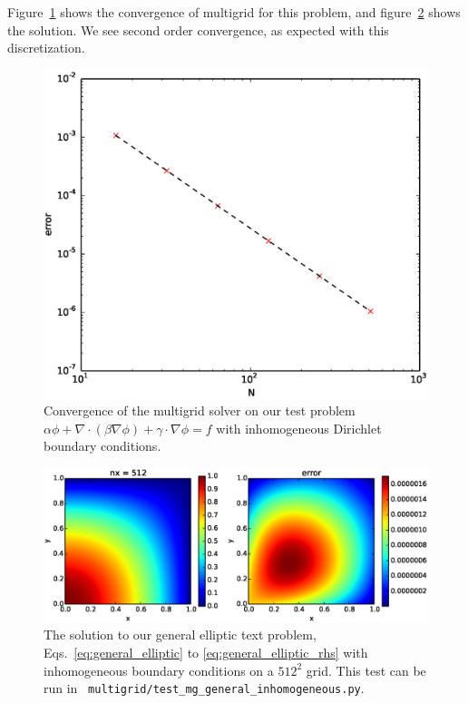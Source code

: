Figure~\ref{fig:general_mg_converge} shows the convergence of multigrid
for this problem, and figure~\ref{fig:general_mg_solution} shows the solution.
We see second order convergence, as expected with this discretization.

\begin{figure}
  \centering
\includegraphics[width=0.6\linewidth]{mg_general_inhomogeneous_converge}
\caption[Convergence of the general elliptic multigrid
  solver]{\label{fig:general_mg_converge} Convergence of the multigrid
  solver on our test problem $\alpha \phi + \nabla \cdot (\beta \nabla \phi) +
  \gamma \cdot \nabla \phi = f$ with inhomogeneous Dirichlet boundary conditions.}
\end{figure}

\begin{figure}
  \centering
  \includegraphics[width=\linewidth]{mg_general_inhomogeneous_test}
  \caption[Solution of a general elliptic equation]
          {\label{fig:general_mg_solution} The solution to our general
            elliptic text problem, Eqs.~\ref{eq:general_elliptic} to
            \ref{eq:general_elliptic_rhs} with inhomogeneous boundary
            conditions on a $512^2$ grid.  This test can be run in \pyro\
            {\tt multigrid/test\_mg\_general\_inhomogeneous.py}.}
\end{figure}
